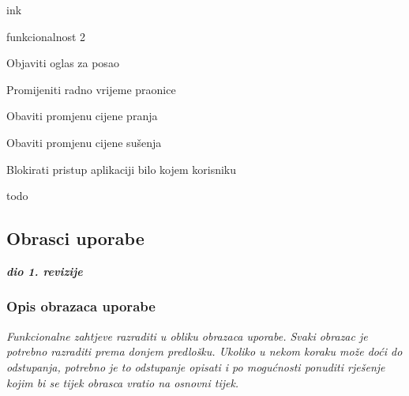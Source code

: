\begin{packed_enum}
				\begin{packed_enum}
					
					\item ink
					\item funkcionalnost 2
					
				\end{packed_enum}
			
				\item  {}
				
				\begin{packed_enum}
					
					\item Objaviti oglas za posao
					\item Promijeniti radno vrijeme praonice
					\item Obaviti promjenu cijene pranja
					\item Obaviti promjenu cijene sušenja
					\item Blokirati pristup aplikaciji bilo kojem korisniku
					
				\end{packed_enum}
			
				\item  {}
				
				\begin{packed_enum}
					
					\item todo
					\item 
					\item 
					\item 
					
				\end{packed_enum}
			
			\end{packed_enum}
			
			\eject 
			
			
				
			\subsection{Obrasci uporabe}
				
				\textbf{\textit{dio 1. revizije}}
				
				\subsubsection{Opis obrazaca uporabe}
					\textit{Funkcionalne zahtjeve razraditi u obliku obrazaca uporabe. Svaki obrazac je potrebno razraditi prema donjem predlošku. Ukoliko u nekom koraku može doći do odstupanja, potrebno je to odstupanje opisati i po mogućnosti ponuditi rješenje kojim bi se tijek obrasca vratio na osnovni tijek.}\\
					

